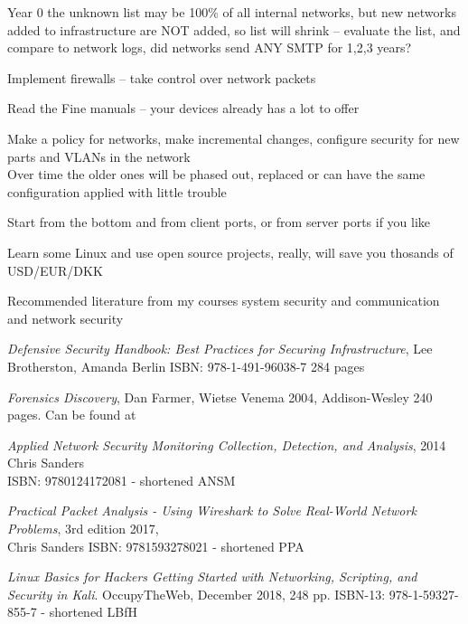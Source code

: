 \documentclass[Screen16to9,17pt]{foils}
\begin{document}
Year 0 the unknown list may be 100\% of all internal networks, but new networks added to infrastructure are NOT added, so list will shrink -- evaluate the list, and compare to network logs, did networks send ANY SMTP for 1,2,3 years?




\begin{list2}
\item Implement firewalls -- take control over network packets
\item Read the Fine manuals -- your devices already has a lot to offer
\item Make a policy for networks, make incremental changes, configure security for new parts and VLANs in the network\\
Over time the older ones will be phased out, replaced or can have the same configuration applied with little trouble
\item Start from the bottom and from client ports, or from server ports if you like
\item Learn some Linux and use open source projects, really, will save you thosands of USD/EUR/DKK
\end{list2}


\myquestionspage

Recommended literature from my courses system security and communication and network security

\begin{list2}
\item \emph{Defensive Security Handbook: Best Practices for Securing Infrastructure}, Lee Brotherston, Amanda Berlin ISBN: 978-1-491-96038-7 284 pages
\item \emph{Forensics Discovery}, Dan Farmer, Wietse Venema 2004, Addison-Wesley 240 pages. Can be found at 
\item \emph{Applied Network Security Monitoring Collection, Detection, and Analysis}, 2014 Chris Sanders \\
ISBN: 9780124172081 - shortened ANSM
\item \emph{Practical Packet Analysis - Using Wireshark to Solve Real-World Network Problems}, 3rd edition 2017, \\
Chris Sanders ISBN: 9781593278021 - shortened PPA
\item \emph{Linux Basics for Hackers Getting Started with Networking, Scripting, and Security in Kali}. OccupyTheWeb, December 2018, 248 pp. ISBN-13: 978-1-59327-855-7 - shortened LBfH
\end{list2}
\end{document}

